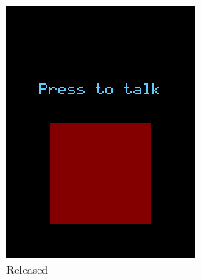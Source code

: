 \documentclass[a4paper,notitlepage,10pt]{report}
\begin{document}
\begin{multicols}{2}
\iffalse
\begin{figure}[H]
	\centering
	\begin{subfigure}[b]{0.4\columnwidth}
		\includegraphics[width=\textwidth]{cap_audio_inact}
		\caption{Released}
		\label{fig:capAudioInAct}
	\end{subfigure}
	\begin{subfigure}[b]{0.4\columnwidth}

\end{subfigure}
\end{figure}
\end{multicols}
\end{document}
